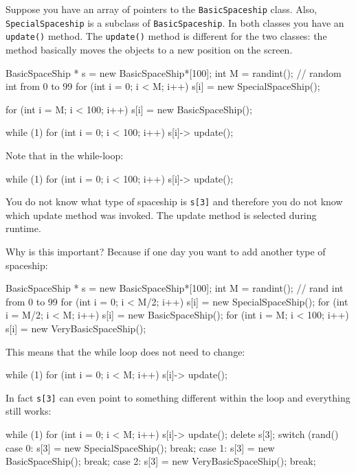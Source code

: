 Suppose you have an array of pointers to the \verb!BasicSpaceship! class.
Also, \verb!SpecialSpaceship! is a subclass of \verb!BasicSpaceship!. In both classes you have an \verb!update()! method. The \verb!update()! method is different for the two classes: the method basically moves the objects to a new position on the screen.

\begin{console}
BasicSpaceShip * s = new BasicSpaceShip*[100];
int M = randint(); // random int from 0 to 99
for (int i = 0; i < M; i++)
{   
    s[i] = new SpecialSpaceShip();
}

for (int i = M; i < 100; i++)
{   
    s[i] = new BasicSpaceShip();
}

while (1)
{   
    for (int i = 0; i < 100; i++)
    {   
        s[i]-> update();
    }
}
\end{console}

Note that in the while-loop:

\begin{console}
while (1)
{   
    for (int i = 0; i < 100; i++)
    {
        s[i]-> update();
    }
}
\end{console}

You do not know what type of spaceship is \verb!s[3]! and therefore you do not know which update method was invoked. The update method is selected during runtime.

Why is this important? Because if one day you want to add another type of spaceship:

\begin{console}
BasicSpaceShip * s = new BasicSpaceShip*[100];
int M = randint(); // rand int from 0 to 99
for (int i = 0; i < M/2; i++)
{   
    s[i] = new SpecialSpaceShip();
}
for (int i = M/2; i < M; i++)
{   
    s[i] = new BasicSpaceShip();
}
for (int i = M; i < 100; i++)
{   
    s[i] = new VeryBasicSpaceShip();
}
\end{console}

This means that the while loop does not need to change:

\begin{console}
while (1)
{   
    for (int i = 0; i < M; i++)
    {   
        s[i]-> update();
    }
}
\end{console}

In fact \verb!s[3]! can even point to something different within the loop
and everything still works:

\begin{console}
while (1)
{   
    for (int i = 0; i < M; i++)
    {   
        s[i]-> update();
    }
    delete s[3];
    switch (rand() %
    {   
        case 0: s[3] = new SpecialSpaceShip(); break;
        case 1: s[3] = new BasicSpaceShip(); break;
        case 2: s[3] = new VeryBasicSpaceShip(); break;
    }
}
\end{console}

